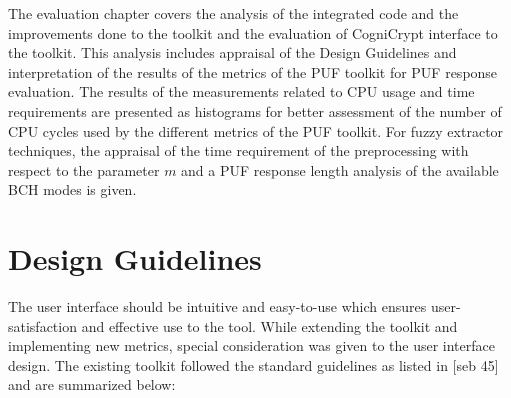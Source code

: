 The evaluation chapter covers the analysis of the integrated code and the improvements done to the toolkit and the evaluation of CogniCrypt interface to the toolkit. This analysis includes appraisal of the Design Guidelines and interpretation of the results of the metrics of the PUF toolkit for PUF response evaluation. The results of the measurements related to CPU usage and time requirements are presented as
histograms for better assessment of the number of CPU cycles used by the different metrics of the PUF toolkit. For fuzzy extractor techniques, the appraisal of the time requirement of the preprocessing  with respect to the parameter $m$ and a PUF response length analysis of the available BCH modes is given.\\

\section{Design Guidelines}
The user interface should be intuitive and easy-to-use which ensures user-satisfaction and effective use to the tool. While extending the toolkit and implementing new metrics, special consideration was given to the user interface design. The existing toolkit followed the standard guidelines as listed in [seb 45] and are summarized below:

